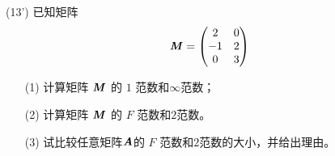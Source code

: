 \documentclass[12pt,a4paper,openany,twoside]{ctexbook}
\begin{document}
%	


\begin{exercise}(13')
	已知矩阵\[ \boldsymbol{\mathit{M}} = \begin{pmatrix}
		2&0\\
		-1&2\\
		0&3\\
	\end{pmatrix}
	\]
	\begin{itemize}
		\item [(1)] 计算矩阵 $\boldsymbol{\mathit{M}}$ 的 $1$ 范数和$\infty$范数；
		\item [(2)] 计算矩阵 $\boldsymbol{\mathit{M}}$ 的 $F$ 范数和$2$范数。
		\item [(3)] 试比较任意矩阵$\boldsymbol{\mathit{A}}$的 $F$ 范数和$2$范数的大小，并给出理由。
	\end{itemize}
\end{exercise}
%	
%	
%	
%	
%	
\end{document}
